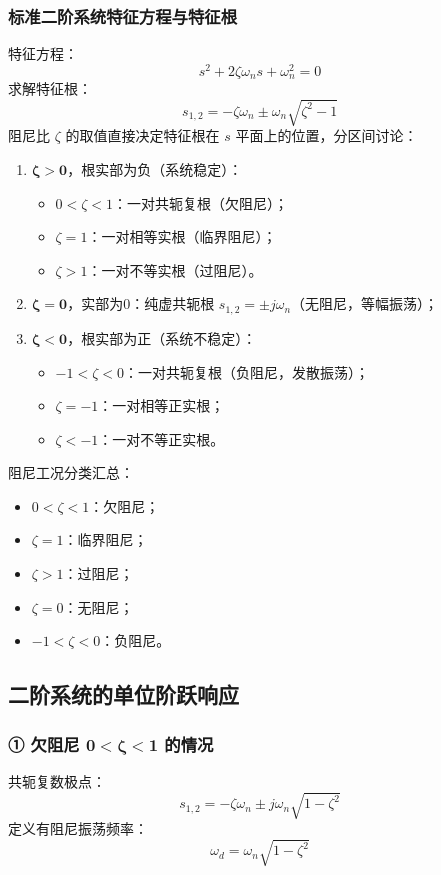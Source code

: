 \subsubsection{标准二阶系统特征方程与特征根}
特征方程：
\[
s^2+2\zeta\omega_n s+\omega_n^2=0
\]
求解特征根：
\[
s_{1,2}=-\zeta\omega_n\pm\omega_n\sqrt{\zeta^2-1}
\]
阻尼比 $\zeta$ 的取值直接决定特征根在 $s$ 平面上的位置，分区间讨论：
\begin{enumerate}
    \item $\boldsymbol{\zeta>0}$，根实部为负（系统稳定）：
    \begin{itemize}
        \item $0<\zeta<1$：一对共轭复根（欠阻尼）；
        \item $\zeta=1$：一对相等实根（临界阻尼）；
        \item $\zeta>1$：一对不等实根（过阻尼）。
    \end{itemize}
    \item $\boldsymbol{\zeta=0}$，实部为0：纯虚共轭根 $s_{1,2}=\pm j\omega_n$（无阻尼，等幅振荡）；
    \item $\boldsymbol{\zeta<0}$，根实部为正（系统不稳定）：
    \begin{itemize}
        \item $-1<\zeta<0$：一对共轭复根（负阻尼，发散振荡）；
        \item $\zeta=-1$：一对相等正实根；
        \item $\zeta<-1$：一对不等正实根。
    \end{itemize}
\end{enumerate}

阻尼工况分类汇总：
\begin{itemize}
    \item $0<\zeta<1$：欠阻尼；
    \item $\zeta=1$：临界阻尼；
    \item $\zeta>1$：过阻尼；
    \item $\zeta=0$：无阻尼；
    \item $-1<\zeta<0$：负阻尼。
\end{itemize}

\subsection{二阶系统的单位阶跃响应}
\subsubsection{① 欠阻尼 $\boldsymbol{0<\zeta<1}$ 的情况}
共轭复数极点：
\[
s_{1,2}=-\zeta\omega_n\pm j\omega_n\sqrt{1-\zeta^2}
\]
定义有阻尼振荡频率：
\[
\omega_d=\omega_n\sqrt{1-\zeta^2}
\]

